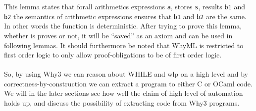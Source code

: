 This lemma states that forall arithmetics expressions \texttt{a}, stores \texttt{s}, results \texttt{b1} and \texttt{b2} the semantics of arithmetic expressions ensures that \texttt{b1} and \texttt{b2} are the same.
In other words the function is deterministic. After trying to prove this lemma, whether is proves or not, it will be ``saved'' as an axiom and can be used in following lemmas.
It should furthermore be noted that WhyML is restricted to first order logic to only allow proof-obligations to be of first order logic.
\\~\\
So, by using Why3 we can reason about WHILE and wlp on a high level and by
correctness-by-construction we can extract a program to either C or OCaml code.
We will in the later sections see how well the claim of high level of automation holds up, and discuss the possibility of extracting code from Why3 programs.
